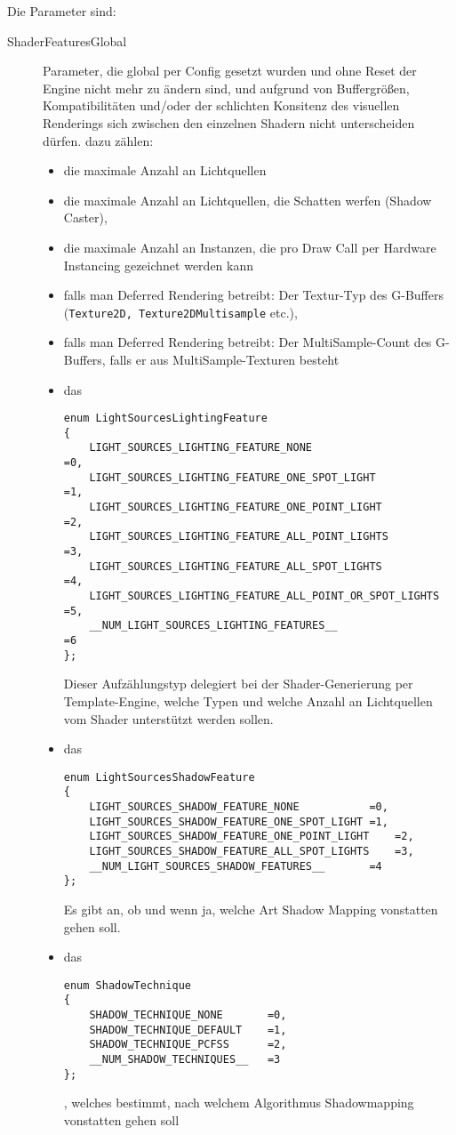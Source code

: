 	Die Parameter sind:	
	\begin{description}
	
	
		\item[ShaderFeaturesGlobal] Parameter, die global per Config gesetzt wurden und ohne Reset der Engine nicht
			mehr zu ändern sind, und aufgrund von Buffergrößen, Kompatibilitäten und/oder der schlichten Konsitenz
			des visuellen Renderings sich zwischen den einzelnen Shadern nicht unterscheiden dürfen. dazu zählen:
		 	\begin{itemize}
		 	\item die maximale Anzahl an Lichtquellen
		 	\item die maximale Anzahl an Lichtquellen, die Schatten werfen (Shadow Caster),
		 	\item die maximale Anzahl an Instanzen, die pro Draw Call per Hardware Instancing gezeichnet werden kann
		 	\item falls man Deferred Rendering betreibt:
		 		 Der Textur-Typ des G-Buffers (\lstinline|Texture2D, Texture2DMultisample| etc.),
		 	\item falls man Deferred Rendering betreibt: Der MultiSample-Count des G-Buffers, falls er aus 
		 		MultiSample-Texturen besteht
		 	\item das
		 	\begin{lstlisting}
enum LightSourcesLightingFeature
{
	LIGHT_SOURCES_LIGHTING_FEATURE_NONE						=0,
	LIGHT_SOURCES_LIGHTING_FEATURE_ONE_SPOT_LIGHT			=1,
	LIGHT_SOURCES_LIGHTING_FEATURE_ONE_POINT_LIGHT			=2,
	LIGHT_SOURCES_LIGHTING_FEATURE_ALL_POINT_LIGHTS			=3,
	LIGHT_SOURCES_LIGHTING_FEATURE_ALL_SPOT_LIGHTS			=4,
	LIGHT_SOURCES_LIGHTING_FEATURE_ALL_POINT_OR_SPOT_LIGHTS	=5,
	__NUM_LIGHT_SOURCES_LIGHTING_FEATURES__					=6
}; 
		 	\end{lstlisting}
		 	Dieser Aufzählungstyp delegiert bei der Shader-Generierung per Template-Engine, welche Typen 
		 	und welche Anzahl an Lichtquellen vom Shader unterstützt werden sollen.
			\item das
		 	\begin{lstlisting}		 	
enum LightSourcesShadowFeature
{
	LIGHT_SOURCES_SHADOW_FEATURE_NONE			=0,
	LIGHT_SOURCES_SHADOW_FEATURE_ONE_SPOT_LIGHT	=1,
	LIGHT_SOURCES_SHADOW_FEATURE_ONE_POINT_LIGHT	=2,
	LIGHT_SOURCES_SHADOW_FEATURE_ALL_SPOT_LIGHTS	=3,
	__NUM_LIGHT_SOURCES_SHADOW_FEATURES__		=4
};	
		 	\end{lstlisting}
		 	Es gibt an, ob und wenn ja, welche Art Shadow Mapping vonstatten gehen soll.
		 	
		 	\item das
		 	\begin{lstlisting}
enum ShadowTechnique
{
	SHADOW_TECHNIQUE_NONE		=0,
	SHADOW_TECHNIQUE_DEFAULT	=1,
	SHADOW_TECHNIQUE_PCFSS		=2,
	__NUM_SHADOW_TECHNIQUES__	=3
};		 	
		 	\end{lstlisting}
		 	, welches bestimmt, nach welchem Algorithmus Shadowmapping vonstatten gehen soll
		\end{itemize}
		

\end{description}
